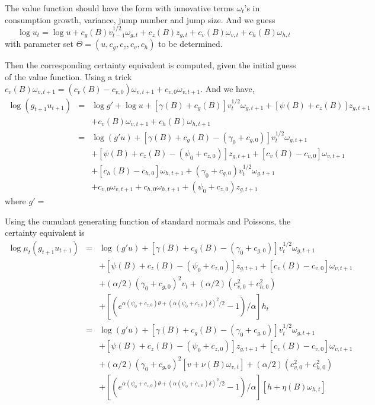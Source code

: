 \documentclass[11pt,reqno,final]{amsart}
\begin{document}
The value function should have the form with innovative terms $\omega_t$'s in consumption growth, variance, jump number and jump size. And we guess
$$
\log u_t = \log u + c_g(B)v_{t-1}^{1/2} \omega_{g,t} + c_z(B)z_{g,t} + c_v(B)\omega_{v,t} + c_h(B)\omega_{h,t}
$$
with parameter set $\Theta=(u, c_g, c_z, c_v, c_h)$ to be determined.

Then the corresponding certainty equivalent is computed, given the initial guess of the value function. Using a trick $c_v(B)\omega_{v,t+1}=(c_v(B)-c_{v,0})\omega_{v,t+1}+c_{v,0}\omega_{v,t+1}$. And we have,
\begin{eqnarray*}
\log(g_{t+1}u_{t+1}) &=& \log g' + \log u + [\gamma(B) + c_g(B)] v_t^{1/2} \omega_{g,t+1} + [\psi(B)+c_z(B)]z_{g,t+1} \\
 & & + c_v(B)\omega_{v,t+1} + c_h(B)\omega_{h,t+1} \\
 &=& \log(g'u) + [\gamma(B)+c_g(B)-(\gamma_0+c_{g,0})] v_t^{1/2} \omega_{g,t+1} \\
 & & + [\psi(B)+c_z(B)-(\psi_0+c_{z,0})]z_{g,t+1} + [c_v(B)-c_{v,0}] \omega_{v,t+1} \\
 & & + [c_h(B)-c_{h,0}] \omega_{h,t+1} + (\gamma_0+c_{g,0}) v_t^{1/2} \omega_{g,t+1} \\
 & & + c_{v,0} \omega_{v,t+1} + c_{h,0} \omega_{h,t+1} + (\psi_0+c_{z,0}) z_{g,t+1}
\end{eqnarray*}
where $g'=$

Using the cumulant generating function of standard normals and Poissons, the certainty equivalent is
\begin{eqnarray*}
\log \mu_t(g_{t+1}u_{t+1}) &=& \log(g'u) + [\gamma(B)+c_g(B)-(\gamma_0+c_{g,0})] v_t^{1/2} \omega_{g,t+1} \\
 & & + [\psi(B)+c_z(B)-(\psi_0+c_{z,0})]z_{g,t+1} + [c_v(B)-c_{v,0}] \omega_{v,t+1} \\
 & & + (\alpha/2)(\gamma_0+c_{g,0})^2 v_t + (\alpha/2)(c_{v,0}^2 + c_{h,0}^2) \\
 & & + [(e^{\alpha(\psi_0+c_{z,0})\theta+(\alpha(\psi_0+c_{z,0})\delta)^2/2}-1)/\alpha] h_t \\
&=& \log(g'u) + [\gamma(B)+c_g(B)-(\gamma_0+c_{g,0})] v_t^{1/2} \omega_{g,t+1} \\
 & & + [\psi(B)+c_z(B)-(\psi_0+c_{z,0})]z_{g,t+1} + [c_v(B)-c_{v,0}] \omega_{v,t+1} \\
 & & + (\alpha/2)(\gamma_0+c_{g,0})^2 [v+\nu(B)\omega_{v,t}] + (\alpha/2)(c_{v,0}^2 + c_{h,0}^2) \\
 & & + [(e^{\alpha(\psi_0+c_{z,0})\theta+(\alpha(\psi_0+c_{z,0})\delta)^2/2}-1)/\alpha] [h+\eta(B)\omega_{h,t}]\\
\end{eqnarray*}
\end{document}
